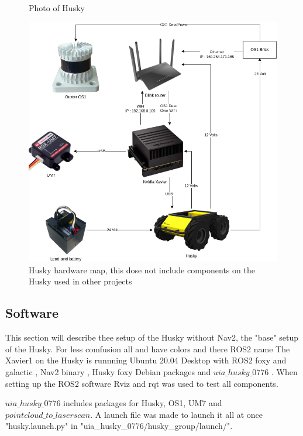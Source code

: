 \begin{figure}[H]
\begin{minipage}[b]{0.4\textwidth}
    \caption{Photo of Husky}
    \label{fig:husky_irl}
  \end{minipage}
  \hfill
  \begin{minipage}[b]{0.59\textwidth}
    \includegraphics[width=\textwidth]{Figures/drawio/Husky_HW.drawio.png}
    \caption{Husky hardware map, this dose not include components on the Husky used in other projects}
    \label{fig:Husky_HW}
  \end{minipage}
\end{figure}

\subsection{Software}
This section will describe thee setup of the Husky without Nav2, the "base" setup of the Husky. For less comfusion all  and  have colors and there ROS2 name 
The Xavier1 on the Husky is runnning Ubuntu 20.04 Desktop \cite{ubuntu20_04} with ROS2 foxy \cite{rosfoxyinstall} and galactic \cite{rosgalacticinstall}, Nav2 binary \cite{rosnavinstall}, Husky foxy Debian packages \cite{huskyinstall} and $uia\_husky\_0776$ \cite{uiahusky}. When setting up the ROS2 software Rviz and rqt was used to test all components. 


$uia\_husky\_0776$ includes packages for Husky, OS1, UM7 and $pointcloud\_to\_laserscan$. A launch file was made to launch it all at once "husky.launch.py" in "uia\_husky\_0776/husky\_group/launch/".


